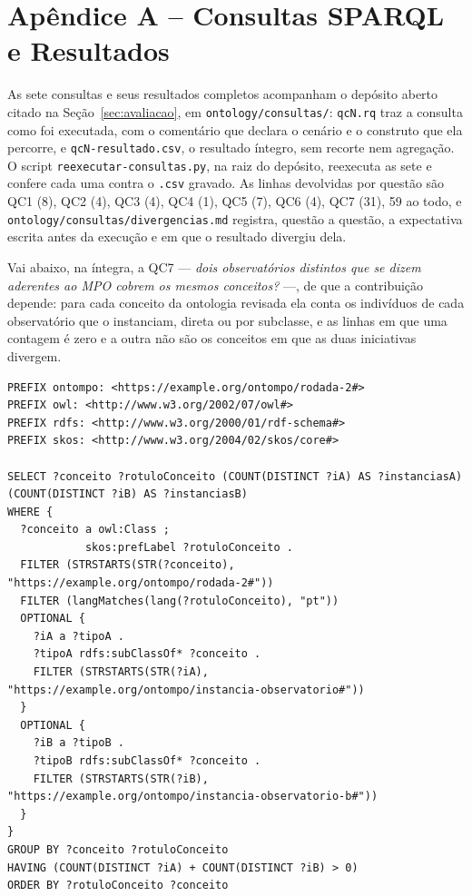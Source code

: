 \section*{Apêndice A -- Consultas SPARQL e Resultados}
\label{sec:apendice-sparql}

As sete consultas e seus resultados completos acompanham o depósito aberto citado na Seção~\ref{sec:avaliacao}, em \texttt{ontology/consultas/}: \texttt{qcN.rq} traz a consulta como foi executada, com o comentário que declara o cenário e o construto que ela percorre, e \texttt{qcN-resultado.csv}, o resultado íntegro, sem recorte nem agregação. O script \texttt{reexecutar-consultas.py}, na raiz do depósito, reexecuta as sete e confere cada uma contra o \texttt{.csv} gravado. As linhas devolvidas por questão são QC1 (8), QC2 (4), QC3 (4), QC4 (1), QC5 (7), QC6 (4), QC7 (31), 59 ao todo, e \texttt{ontology/consultas/divergencias.md} registra, questão a questão, a expectativa escrita antes da execução e em que o resultado divergiu dela.

Vai abaixo, na íntegra, a QC7 --- \textit{dois observatórios distintos que se dizem aderentes ao MPO cobrem os mesmos conceitos?} ---, de que a contribuição depende: para cada conceito da ontologia revisada ela conta os indivíduos de cada observatório que o instanciam, direta ou por subclasse, e as linhas em que uma contagem é zero e a outra não são os conceitos em que as duas iniciativas divergem.

\begin{Verbatim}[fontsize=\tiny, xleftmargin=1.2cm]
PREFIX ontompo: <https://example.org/ontompo/rodada-2#>
PREFIX owl: <http://www.w3.org/2002/07/owl#>
PREFIX rdfs: <http://www.w3.org/2000/01/rdf-schema#>
PREFIX skos: <http://www.w3.org/2004/02/skos/core#>

SELECT ?conceito ?rotuloConceito (COUNT(DISTINCT ?iA) AS ?instanciasA) (COUNT(DISTINCT ?iB) AS ?instanciasB)
WHERE {
  ?conceito a owl:Class ;
            skos:prefLabel ?rotuloConceito .
  FILTER (STRSTARTS(STR(?conceito), "https://example.org/ontompo/rodada-2#"))
  FILTER (langMatches(lang(?rotuloConceito), "pt"))
  OPTIONAL {
    ?iA a ?tipoA .
    ?tipoA rdfs:subClassOf* ?conceito .
    FILTER (STRSTARTS(STR(?iA), "https://example.org/ontompo/instancia-observatorio#"))
  }
  OPTIONAL {
    ?iB a ?tipoB .
    ?tipoB rdfs:subClassOf* ?conceito .
    FILTER (STRSTARTS(STR(?iB), "https://example.org/ontompo/instancia-observatorio-b#"))
  }
}
GROUP BY ?conceito ?rotuloConceito
HAVING (COUNT(DISTINCT ?iA) + COUNT(DISTINCT ?iB) > 0)
ORDER BY ?rotuloConceito ?conceito
\end{Verbatim}
